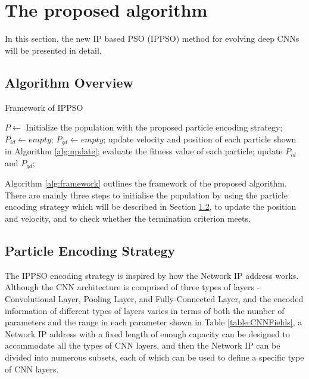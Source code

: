 \documentclass[conference]{IEEEtran}
\begin{document}
\section{The proposed algorithm}\label{sec:ProposedAlgorithm}
In this section, the new IP based PSO (IPPSO) method for evolving deep CNNs will be presented in detail.


\subsection{Algorithm Overview}
\begin{algorithm}
	\caption{Framework of IPPSO}
	\label{alg:framework}
	\begin{algorithmic}
		\renewcommand{\algorithmicrequire}{\textbf{Input:}}
		\renewcommand{\algorithmicensure}{\textbf{Output:}}
		\STATE $P \leftarrow$ Initialize the population with the proposed particle encoding strategy;
		\STATE $P_{id} \leftarrow empty$;
		\STATE $P_{gd} \leftarrow empty$;
			\STATE update velocity and position of each particle shown in Algorithm \ref{alg:update};
			\STATE evaluate the fitness value of each particle;
			\STATE update $P_{id}$ and $P_{gd}$;
		\ENDWHILE
	\end{algorithmic}
\end{algorithm}

Algorithm \ref{alg:framework} outlines the framework of the proposed algorithm. There are mainly three steps to initialise the population by using the particle encoding strategy which will be described in Section \ref{sec:ParticleEncodingStrategy}, to update the position and velocity, and to check whether the termination criterion meets.

\subsection{Particle Encoding Strategy}\label{sec:ParticleEncodingStrategy}

The IPPSO encoding strategy is inspired by how the Network IP address works. Although the CNN architecture is comprised of three types of layers - Convolutional Layer, Pooling Layer, and Fully-Connected Layer, and the encoded information of different types of layers varies in terms of both the number of parameters and the range in each parameter shown in Table \ref{table:CNNFields}, a Network IP address with a fixed length of enough capacity can be designed to accommodate all the types of CNN layers, and then the Network IP can be divided into numerous subsets, each of which can be used to define a specific type of CNN layers.
\end{document}
